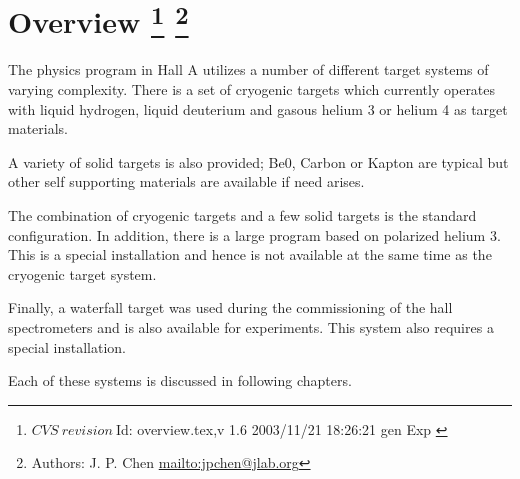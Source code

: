 \chapter[Overview]{ Overview
\footnote{
  $CVS~revision~ $Id: overview.tex,v 1.6 2003/11/21 18:26:21 gen Exp $ $ }
\footnote{Authors: J. P. Chen \url{mailto:jpchen@jlab.org}}
}

The physics program in Hall A utilizes a number of different
target systems of varying complexity. There is a set of
cryogenic targets which currently operates with liquid hydrogen, liquid
deuterium and gasous helium 3 or helium 4
as target materials.

A variety of solid targets is also provided; Be0, Carbon or
Kapton are typical but other self supporting materials are available if need arises.

The combination of cryogenic targets and a few solid targets is
the standard configuration. In addition,
there is a large program based on polarized helium 3. This
is a special installation and hence is not available at the same
time as the cryogenic target system.

Finally, a waterfall target was used during the commissioning of
the hall spectrometers and is also available for experiments. This system also 
requires a special installation.

Each of these systems is discussed in following chapters.
%
%
%
%
%
%
